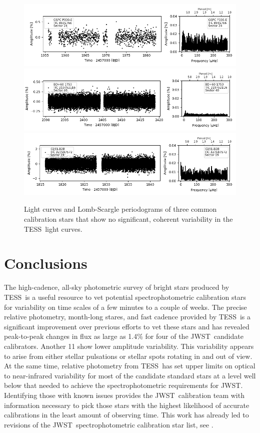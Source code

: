 \documentclass[twocolumn]{aastex631}
\newcommand{\webb}{JWST}
\newcommand{\jwst}{JWST}
\newcommand{\tess}{TESS}
\begin{document}
\begin{figure}
    \centering
    \includegraphics[width=0.8\linewidth]{figures/tic00000008591766_s024_flat2.fits.png}
    \includegraphics[width=0.8\linewidth]{tic00000219752116_s040_flat1.fits.png}
    \includegraphics[width=0.8\linewidth]{figures/tic00000327587572_s019_norm1.fits.png}
    \caption{Light curves and Lomb-Scargle periodograms of three common calibration stars that show no significant, coherent variability in the \tess\ light curves.}
    \label{fig:novar}
\end{figure}

\section{Conclusions}
\label{sec:conclusion}

The high-cadence, all-sky photometric survey of bright stars produced by \tess\ is a useful resource to vet potential spectrophotometric calibration stars for variability on time scales of a few minutes to a couple of weeks. The precise relative photometry, month-long stares, and fast cadence provided by \tess\ is a significant improvement over previous efforts to vet these stars and has revealed peak-to-peak changes in flux as large as 1.4\% for four of the \webb\ candidate calibrators. Another 11 show lower amplitude variability. This variability appears to arise from either stellar pulsations or stellar spots rotating in and out of view. At the same time, relative photometry from \tess\ has set upper limits on optical to near-infrared variability for most of the candidate standard stars at a level well below that needed to achieve the spectrophotometric requirements for \jwst.  Identifying those with known issues provides the \webb\ calibration team with information necessary to pick those stars with the highest likelihood of accurate calibrations in the least amount of observing time. This work has already led to revisions of the \webb\ spectrophotometric calibration star list, see \citet{Gordon2022inprep}.
\end{document}
